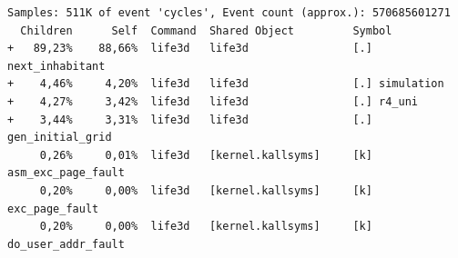 \documentclass{article}
\begin{document}
\begin{lstlisting}[caption={\texttt{perf} report on run with $n=1024$ and $3$
generations}]
Samples: 511K of event 'cycles', Event count (approx.): 570685601271
  Children      Self  Command  Shared Object         Symbol
+   89,23%    88,66%  life3d   life3d                [.] next_inhabitant
+    4,46%     4,20%  life3d   life3d                [.] simulation
+    4,27%     3,42%  life3d   life3d                [.] r4_uni
+    3,44%     3,31%  life3d   life3d                [.] gen_initial_grid
     0,26%     0,01%  life3d   [kernel.kallsyms]     [k] asm_exc_page_fault
     0,20%     0,00%  life3d   [kernel.kallsyms]     [k] exc_page_fault
     0,20%     0,00%  life3d   [kernel.kallsyms]     [k] do_user_addr_fault
\end{lstlisting}

\newpage



% 

\end{document}
